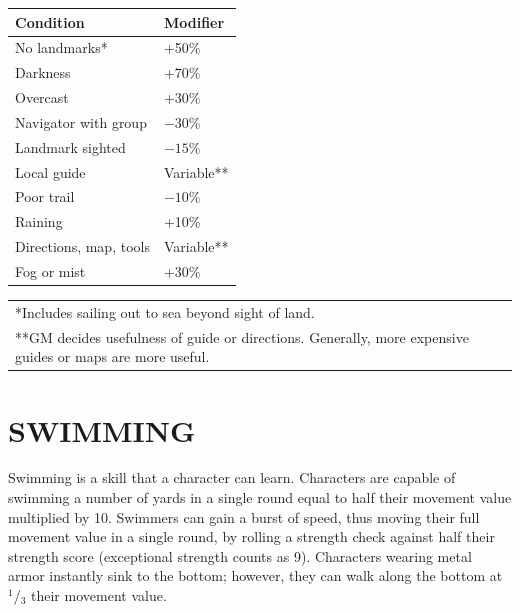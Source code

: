 \begin{multicols}{2}
\begin{minipage}{\columnwidth}
\end{minipage}

\noindent
\begin{minipage}{\columnwidth}

\label{lostmods}
\noindent
\begin{tabular}{|p{}|p{}|}
\hline
Condition				& Modifier \\
\hline\hline
\rowcolor[gray]{.9}No landmarks*			& +50\% \\
Darkness				& +70\% \\
\rowcolor[gray]{.9}Overcast				& +30\% \\
Navigator with group	& $-30$\% \\
\rowcolor[gray]{.9}Landmark sighted		& $-15$\% \\
Local guide				& Variable** \\
\rowcolor[gray]{.9}Poor trail				& $-10$\% \\
Raining					& +10\% \\
\rowcolor[gray]{.9}Directions, map, tools	& Variable** \\
Fog or mist				& +30\% \\
\hline
\end{tabular}
\noindent\begin{tabular}{p{}}
*Includes sailing out to sea beyond sight of land. \\
**GM decides usefulness of guide or directions. Generally, more expensive guides or maps are more useful. \\
\end{tabular}\vspace{.5em}

\end{minipage}

\section{SWIMMING}

Swimming is a skill that a character can learn.  Characters are capable of swimming a number of yards in a single round equal to half their movement value multiplied by 10.  Swimmers can gain a burst of speed, thus moving their full movement value in a single round, by rolling a strength check against half their strength score (exceptional strength counts as 9).  Characters wearing metal armor instantly sink to the bottom; however, they can walk along the bottom at $^1$/$_3$ their movement value.  


\end{multicols}
